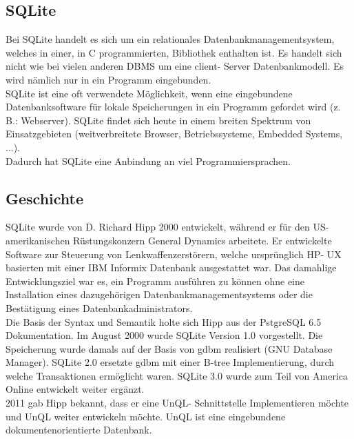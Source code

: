 \documentclass[12pt,a4paper]{report}
\begin{document}
\begin{onehalfspace}
\section{SQLite}
Bei SQLite handelt es sich um ein relationales Datenbankmanagementsystem, welches in einer, in C programmierten, Bibliothek enthalten ist. Es handelt sich nicht wie bei vielen anderen DBMS um eine client- Server Datenbankmodell. Es wird nämlich nur in ein Programm eingebunden.\\

SQLite ist eine oft verwendete Möglichkeit, wenn eine eingebundene Datenbanksoftware für lokale Speicherungen in ein Programm gefordet wird (z. B.: Webserver). SQLite findet sich heute in einem breiten Spektrum von Einsatzgebieten (weitverbreitete Browser, Betriebssysteme, Embedded Systems, ...).\\

Dadurch hat SQLite eine Anbindung an viel Programmiersprachen.

\subsection{Geschichte}
SQLite wurde von D. Richard Hipp 2000 entwickelt, während er für den US- amerikanischen Rüstungskonzern General Dynamics arbeitete. Er entwickelte Software zur Steuerung von Lenkwaffenzerstörern, welche ursprünglich HP- UX basierten mit einer IBM Informix Datenbank ausgestattet war. Das damahlige Entwicklungsziel war es, ein Programm ausführen zu können ohne eine Installation eines dazugehörigen Datenbankmanagementsystems oder die Bestätigung eines Datenbankadministrators.\\

Die Basis der Syntax und Semantik holte sich Hipp aus der PstgreSQL 6.5 Dokumentation. Im August 2000 wurde SQLite Version 1.0 vorgestellt. Die Speicherung wurde damals auf der Basis von gdbm realisiert (GNU Database Manager). SQLite 2.0 ersetzte gdbm mit einer B-tree Implementierung, durch welche Transaktionen ermöglicht waren. SQLite 3.0 wurde zum Teil von America Online entwickelt weiter ergänzt. \\

2011 gab Hipp bekannt, dass er eine UnQL- Schnittstelle Implementieren möchte und UnQL weiter entwickeln möchte. UnQL ist eine eingebundene dokumentenorientierte Datenbank.


\end{onehalfspace}
\end{document}
